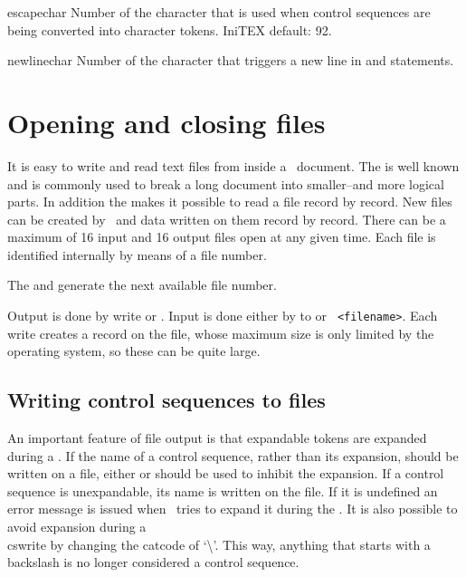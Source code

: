 \begin{docCommand*}{escapechar}{}
 Number of the character that is used when control sequences are being converted into character tokens. IniTEX default: 92.\\
\end{docCommand*}

\begin{docCommand*}{newlinechar}{}
 Number of the character that triggers a new line in  and 
statements.
\end{docCommand*}

\section{Opening and closing files}

It is easy to write and read text files from inside a \tex\  document. The \cmd{} is well known and is commonly used
to break a long document into smaller--and more logical parts. In addition the \cmd{\read} makes it  possible to
read a file record by record. New files can be created by \tex\ and data written on them record by record. There can be
a maximum of 16 input and 16 output files open at any given time. Each file is identified  internally by means of a file number. 


The \cmd{\newread} and \cmd{\newwrite} generate the next available file number. 



Output is done by write or \cmd{\immediate}\cmd{\write}. Input is done either by  to or 
\verb+ <filename>+. Each write creates a record on the file, whose maximum size is only limited by the operating system, so these can be quite large.

\subsection{Writing control sequences to files}

An important feature of file output is that expandable tokens are expanded during a . If the
name of a control sequence, rather than its expansion, should be written on a file, either
\cmd{\noexpand} or \cmd{\string} should be used to inhibit the expansion. If a control sequence is unexpandable,
its name is written on the file. If it is undefined an error message is issued when \tex\ tries to expand it during
the \cmd{\write}. It is also possible to avoid expansion during a \\cs{write} by changing the catcode of `\textbackslash'.
This way, anything that starts with a backslash is no longer considered a control sequence.

